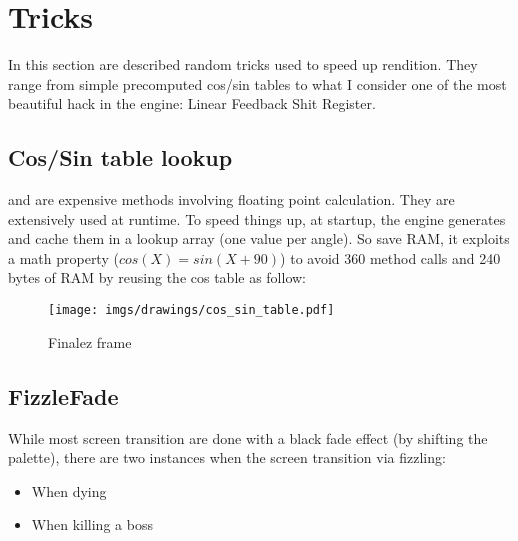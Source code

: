 \section{Tricks}

In this section are described random tricks used to speed up rendition. They range from simple precomputed cos/sin tables to what I consider one of the most beautiful hack in the engine: Linear Feedback Shit Register.




\subsection{Cos/Sin table lookup}
 and  are expensive methods involving floating point calculation. They are extensively used at runtime. To speed things up, at startup, the engine generates and cache them in a lookup array (one value per angle). So save RAM, it exploits a math property ($cos(X) = sin(X + 90)$) to avoid 360  method calls and 240 bytes of RAM by reusing the cos table as follow:\\
\par

\begin{minipage}{\textwidth}

\end{minipage}


\begin{figure}[H]
 \centering
  \texttt{[image: imgs/drawings/cos\_sin\_table.pdf]}
 \caption{Finalez frame} 
\end{figure}








\subsection{FizzleFade}
While most screen transition are done with a black fade effect (by shifting the palette), there are two instances
when the screen transition via fizzling:
\begin{itemize}
	\item When dying
	\item When killing a boss
\end{itemize}




\begin{minipage}{\textwidth}
\centering
  \\
  \vspace*{0.5cm}
  \\
\end{minipage}

